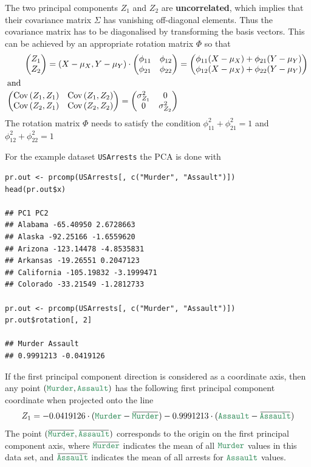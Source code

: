 \documentclass[11pt]{article}
\theoremstyle{definition}
\newcommand*\Z{\mathbb{Z}}
\newcommand*\Cov[1]{\mathop{\text{Cov}}\left(#1\right)}
\newcommand*\predvar[1]{{\color{SeaGreen4} \texttt{#1}}}
\newcommand{\overbar}[1]{\mkern 1.5mu\overline{\mkern-1.5mu#1\mkern-1.5mu}\mkern 1.5mu}
\begin{document}
The two principal components $Z_1$ and $Z_2$ are \textbf{uncorrelated}, which implies that their covariance matrix $\Sigma$ has vanishing off-diagonal elements. Thus the covariance matrix has to be diagonalised by transforming the basis vectors. This can be achieved by an appropriate rotation matrix $\Phi$ so that
\begin{align*}
\begin{pmatrix} Z_1\\Z_2 \end{pmatrix} = (X-\mu_X, Y-\mu_Y) \cdot \begin{pmatrix}\phi_{11}&\phi_{12}\\\phi_{21}&\phi_{22}\end{pmatrix} &= \begin{pmatrix}
\phi_{11}(X-\mu_X) + \phi_{21}(Y-\mu_Y)\\
\phi_{12}(X-\mu_X) + \phi_{22}(Y-\mu_Y)
\end{pmatrix}\\
\intertext{and}
\begin{pmatrix} \Cov{Z_1,Z_1} & \Cov{Z_1,Z_2}\\ \Cov{Z_2,Z_1} & \Cov{Z_2,Z_2} \end{pmatrix} = \begin{pmatrix} \sigma_{Z_1}^2 & 0 \\ 0 & \sigma_{Z_2}^2 \end{pmatrix}
\end{align*}
The rotation matrix $\Phi$ needs to satisfy the condition $\phi_{11}^2 + \phi_{21}^2 = 1$ and $\phi_{12}^2 + \phi_{22}^2 = 1$

\vspace{1em}
\noindent
For the example dataset \predvar{USArrests} the PCA is done with
\begin{verbatim}
pr.out <- prcomp(USArrests[, c("Murder", "Assault")])
head(pr.out$x)

## PC1 PC2
## Alabama -65.40950 2.6728663
## Alaska -92.25166 -1.6559620
## Arizona -123.14478 -4.8535831
## Arkansas -19.26551 0.2047123
## California -105.19832 -3.1999471
## Colorado -33.21549 -1.2812733

pr.out <- prcomp(USArrests[, c("Murder", "Assault")])
pr.out$rotation[, 2]

## Murder Assault
## 0.9991213 -0.0419126
\end{verbatim}
If the first principal component direction is considered as a coordinate axis, then any point $(\predvar{Murder},\predvar{Assault})$ has the following first principal component coordinate when projected onto the line
\begin{equation*}
Z_1 = -0.0419126\cdot(\text{\predvar{Murder}} - \overbar{\text{\predvar{Murder}}}) - 0.9991213\cdot(\text{\predvar{Assault}} - \overbar{\text{\predvar{Assault}}})
\end{equation*}
The point $(\overbar{\text{\predvar{Murder}}},\overbar{\text{\predvar{Assault}}})$ corresponds to the origin on the first principal component axis, where $\overbar{\text{\predvar{Murder}}}$ indicates the mean of all $\predvar{Murder}$ values in this data set, and $\overbar{\text{\predvar{Assault}}}$ indicates the mean of all arrests for $\predvar{Assault}$ values.
\end{document}
